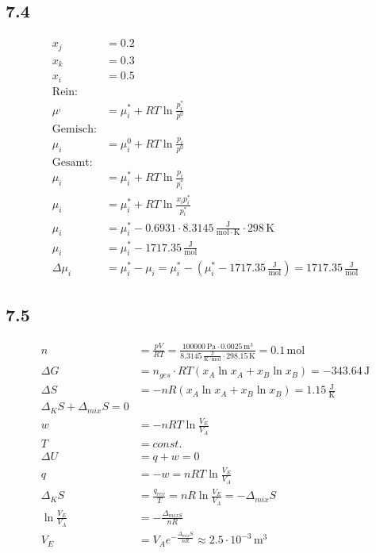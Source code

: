 \documentclass{article}
\begin{document}
\subsection*{7.4}
\begin{align*}
    x_j &= 0.2\\
    x_k &= 0.3\\
    x_i &= 0.5\\
    \text{Rein:}\\
    \mu^_i &= \mu^*_i + RT\ln \frac{p^*_i}{p^0}\\
    \text{Gemisch:}\\
    \mu_i &= \mu_i^0 + RT \ln \frac{p_i}{p^0}\\
    \text{Gesamt:}\\
    \mu_i &= \mu^*_i + RT\ln \frac{p_i}{p^*_i}\\
    \mu_i &= \mu^*_i + RT\ln \frac{x_ip^*_i}{p^*_i}\\
    \mu_i &= \mu^*_i - 0.6931 \cdot 8.3145\,\mathrm{\frac{J}{mol \cdot K} \cdot 298\,\mathrm{K}}\\
    \mu_i &= \mu^*_i - 1717.35\,\mathrm{\frac{J}{mol}}\\
    \Delta \mu_i &= \mu^*_i - \mu_i = \mu^*_i - (\mu^*_i - 1717.35\,\mathrm{\frac{J}{mol}}) = 1717.35\,\mathrm{\frac{J}{mol}}
\end{align*}

\subsection*{7.5}
\begin{align*}
    n&=\frac{pV}{RT}=\frac{100000\,\mathrm{Pa}\cdot 0.0025\,\mathrm{m^3}}{8.3145\,\mathrm{\frac{J}{K\cdot mol}} \cdot 298.15\,\mathrm{K}} = 0.1\,\mathrm{mol}\\
    \Delta G &= n_{ges} \cdot RT(x_A\ln x_A + x_B \ln x_B) = -343.64\,\mathrm{J}\\
    \Delta S &= -nR(x_A\ln x_A + x_B \ln x_B) = 1.15\,\mathrm{\frac{J}{K}}\\
    \Delta_KS + \Delta_{mix}S = 0\\
    w &= -nRT\ln\frac{V_E}{V_A}\\
    T &= const.\\
    \Delta U &= q+w = 0\\
    q &= -w = nRT\ln\frac{V_E}{V_A}\\
    \Delta_K S &= \frac{q_{rev}}{T} = nR\ln\frac{V_E}{V_A} = -\Delta_{mix}S\\
    \ln \frac{V_E}{V_A} &= -\frac{\Delta_{mix S}}{nR}\\
    V_E &= V_A e^{-\frac{\Delta_{mix}S}{nR}} \approx 2.5\cdot 10^{-3}\,\mathrm{m^3}
\end{align*}
\end{document}
